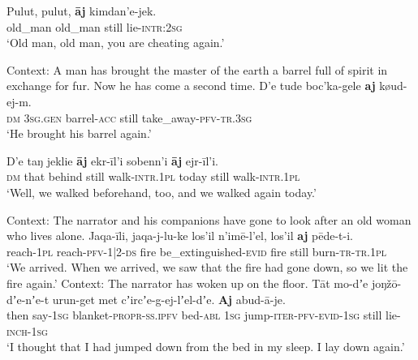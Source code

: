 \begin{exe}

	\ex\label{appendixSouthernYukaghirIterative1}
	\gll Pulut, pulut, \textbf{āj} kimdan’e-jek.\\
	old\_man old\_man still lie-\textsc{intr}:2\textsc{sg}\\
	\glt \lq Old man, old man, you are cheating again.' \parencite[529]{Maslova2003}

	\ex\label{appendixSouthernYukaghirIterative2}
	 Context: A man has brought the master of the earth a barrel full of spirit in exchange for fur. Now he has come a second time.
	\exi{} \gll D’e tude boc’ka-gele \textbf{aj} køud-ej-m.\\
	\textsc{dm} 3\textsc{sg}.\textsc{gen} barrel-\textsc{acc} still take\_away-\textsc{pfv}-\textsc{tr}.3\textsc{sg}\\
	\glt \lq He brought his barrel again.' \parencite[text 25]{NikolaevaMayer2004}

	\ex\label{exAppendixKolymaAdditiveIterative}
	\gll D\rq{}e taŋ jeklie \textbf{āj} ekr-īl\rq{}i sobenn\rq{}i \textbf{āj} ejr-īl\rq{}i.\\
	\textsc{dm} that behind still walk-\textsc{intr}.1\textsc{pl} today still walk-\textsc{intr}.1\textsc{pl}\\
	\glt \lq Well, we walked beforehand, too, and we walked again today.\rq{ }\parencite[529]{Maslova2003}

	\ex Context: The narrator and his companions have gone to look after an old woman who lives alone.\label{appendixSouthernYukaghirRestitutive1}
	\exi{}\gll Jaqa-īli, jaqa-j-lu-ke los’il n’imē-l’el, los’il \textbf{aj} pēde-t-i.\\
	reach-1\textsc{pl} reach-\textsc{pfv}-1|2-\textsc{ds} fire be\_extinguished-\textsc{evid} fire still burn-\textsc{tr}-\textsc{tr}.1\textsc{pl}\\
	\glt \lq We arrived. When we arrived, we saw that the fire had gone down, so we lit the fire again.' \parencite[Text 31]{NikolaevaMayer2004}
	\ex Context: The narrator has woken up on the floor.\label{appendixSouthernYukaghirRestitutive2}
	\exi{}\gll Tāt mo-dʼe joŋžō-dʼe-nʼe-t urun-get met cʼircʼe-g-ej-lʼel-dʼe. \textbf{Aj} abud-ā-je.\\
	then say-1\textsc{sg} blanket-\textsc{propr}-\textsc{ss}.\textsc{ipfv} bed-\textsc{abl} 1\textsc{sg} jump-\textsc{iter}-\textsc{pfv}-\textsc{evid}-1\textsc{sg} still lie-\textsc{inch}-1\textsc{sg}\\
	\glt \lq I thought that I had jumped down from the bed in my sleep. I lay down again.' \parencite[Text 42]{NikolaevaMayer2004}
\end{exe}

